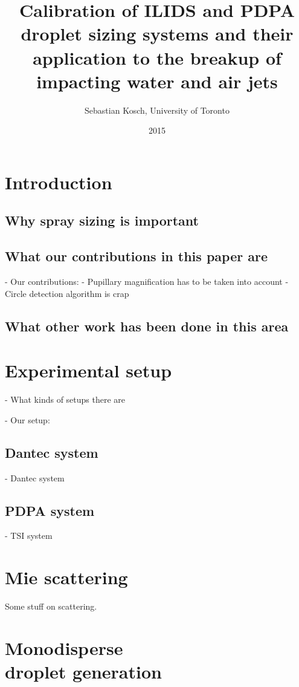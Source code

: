 \documentclass[11.5pt]{book}
\begin{document}
\title{Calibration of ILIDS and PDPA droplet sizing systems and their
application to the breakup of impacting water and air jets}
\author{Sebastian Kosch, University of Toronto}
\date{2015}
\maketitle

\printnomenclature[5em]

\chapter{Introduction}
\section{Why spray sizing is important}
\section{What our contributions in this paper are}
- Our contributions:
    - Pupillary magnification has to be taken into account
    - Circle detection algorithm is crap
\section{What other work has been done in this area}

\chapter{Experimental setup}
- What kinds of setups there are

- Our setup:
\section{Dantec system}
    - Dantec system
\section{PDPA system}
    - TSI system

\chapter{Mie scattering}
Some stuff on scattering.

\chapter[Monodisperse droplet generation]{Monodisperse\\droplet generation}
\label{sec:droplet-generator}
\end{document}
